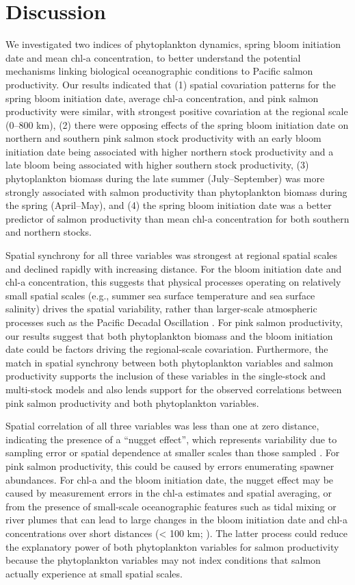 \section{Discussion}

We investigated two indices of phytoplankton dynamics, spring bloom initiation
date and mean chl-a concentration, to better understand the potential mechanisms
linking biological oceanographic conditions to Pacific salmon productivity. Our
results indicated that (1) spatial covariation patterns for the spring bloom
initiation date, average chl-a concentration, and pink salmon productivity were
similar, with strongest positive covariation at the regional scale (0--800 km),
(2) there were opposing effects of the spring bloom initiation date on northern
and southern pink salmon stock productivity with an early bloom initiation date
being associated with higher northern stock productivity and a late bloom being
associated with higher southern stock productivity, (3) phytoplankton biomass
during the late summer (July--September) was more strongly associated with salmon
productivity than phytoplankton biomass during the spring (April--May), and (4)
the spring bloom initiation date was a better predictor of salmon productivity
than mean chl-a concentration for both southern and northern stocks.

Spatial synchrony for all three variables was strongest at regional spatial
scales and declined rapidly with increasing distance. For the bloom initiation
date and chl-a concentration, this suggests that physical processes operating on
relatively small spatial scales (e.g., summer sea surface temperature and sea
surface salinity) drives the spatial variability, rather than larger-scale
atmospheric processes such as the Pacific Decadal Oscillation
\citep{Mueter2002b}. For pink salmon productivity, our results suggest that both
phytoplankton biomass and the bloom initiation date could be factors driving the
regional-scale covariation. Furthermore, the match in spatial synchrony between
both phytoplankton variables and salmon productivity supports the inclusion of
these variables in the single-stock and multi-stock models and also lends
support for the observed correlations between pink salmon productivity and both
phytoplankton variables.

Spatial correlation of all three variables was less than one at zero distance,
indicating the presence of a ``nugget effect'', which represents variability due
to sampling error or spatial dependence at smaller scales than those sampled
\citep{Cressie1993}. For pink salmon productivity, this could be caused by
errors enumerating spawner abundances. For chl-a and the bloom initiation date,
the nugget effect may be caused by measurement errors in the chl-a estimates and
spatial averaging, or from the presence of small-scale oceanographic features
such as tidal mixing or river plumes that can lead to large changes in the bloom
initiation date and chl-a concentrations over short distances (\textless{} 100
km; \citealp{Henson2007a}). The latter process could reduce the explanatory power
of both phytoplankton variables for salmon productivity because the
phytoplankton variables may not index conditions that salmon actually experience
at small spatial scales.

